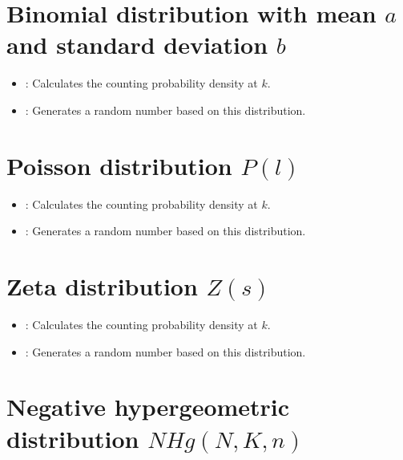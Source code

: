 \section{Binomial distribution with mean \texorpdfstring{$a$}{a} and standard deviation \texorpdfstring{$b$}{b}}

\begin{itemize}

\item
{}:
Calculates the counting probability density at $k$.

\item
{}:
Generates a random number based on this distribution.

\end{itemize}



\section{Poisson distribution \texorpdfstring{$P(l)$}{P(l)}}

\begin{itemize}

\item
{}:
Calculates the counting probability density at $k$.

\item
{}:
Generates a random number based on this distribution.

\end{itemize}



\section{Zeta distribution \texorpdfstring{$Z(s)$}{Z(s)}}

\begin{itemize}

\item
{}:
Calculates the counting probability density at $k$.

\item
{}:
Generates a random number based on this distribution.

\end{itemize}



\section{Negative hypergeometric distribution \texorpdfstring{$NHg(N,K,n)$}{NHg(N,K,n)}}

